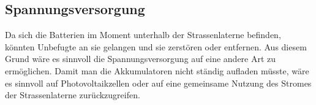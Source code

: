 \subsection{Spannungsversorgung}
Da sich die Batterien im Moment unterhalb der Strassenlaterne befinden, könnten Unbefugte an sie gelangen und sie zerstören oder entfernen. Aus diesem Grund wäre es sinnvoll die Spannungsversorgung auf eine andere Art zu ermöglichen. Damit man die Akkumulatoren nicht ständig aufladen müsste, wäre es sinnvoll auf Photovoltaikzellen oder auf eine gemeinsame Nutzung des Stromes der Strassenlaterne zurückzugreifen.